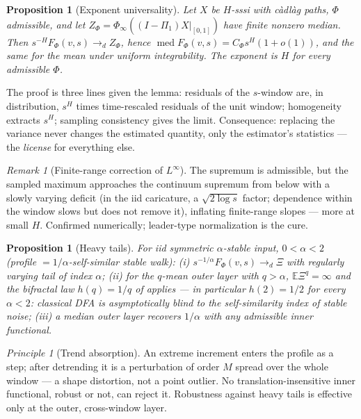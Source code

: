 \documentclass[10pt, letterpaper]{paper}
\newtheorem{proposition}[theorem]{Proposition}
\theoremstyle{remark}
\newtheorem{remark}[theorem]{Remark}
\newtheorem{principle}[theorem]{Principle}
\newcommand{\E}{\mathbb{E}}
\newcommand{\Phifun}{\Phi}
\begin{document}
\begin{proposition}[Exponent universality]\label{prop:universal}
Let $X$ be $H$-sssi with c\`adl\`ag paths, $\Phifun$ admissible,
and let $Z_\Phifun=\Phifun_\infty((I-\Pi_1)X|_{[0,1]})$ have finite
nonzero median. Then $s^{-H}F_\Phifun(v,s)\to_dZ_\Phifun$, hence
$\operatorname{med}F_\Phifun(v,s)=C_\Phifun s^H(1+o(1))$, and the
same for the mean under uniform integrability. The exponent is $H$
for \emph{every} admissible $\Phifun$.
\end{proposition}

The proof is three lines given the lemma: residuals of the
$s$-window are, in distribution, $s^H$ times time-rescaled residuals
of the unit window; homogeneity extracts $s^H$; sampling consistency
gives the limit. Consequence: replacing the variance never changes
the estimated quantity, only the estimator's statistics --- the
\emph{license} for everything else.

\begin{remark}[Finite-range correction of $L^\infty$]\label{rem:linf}
The supremum is admissible, but the sampled maximum approaches the
continuum supremum from below with a slowly varying deficit (in the
iid caricature, a $\sqrt{2\log s}$ factor; dependence within the
window slows but does not remove it), inflating finite-range slopes
--- more at small $H$. Confirmed numerically; leader-type
normalization \citep{jaffard2004} is the cure.
\end{remark}

\begin{proposition}[Heavy tails]\label{prop:stable}
For iid symmetric $\alpha$-stable input, $0<\alpha<2$ (profile
$=1/\alpha$-self-similar stable walk): (i)
$s^{-1/\alpha}F_\Phifun(v,s)\to_d\Xi$ with regularly varying tail of
index $\alpha$; (ii) for the $q$-mean outer layer with $q>\alpha$,
$\E\Xi^q=\infty$ and the bifractal law $h(q)=1/q$ of
\citet{nakao2000} applies --- in particular $h(2)=1/2$ for every
$\alpha<2$: \emph{classical DFA is asymptotically blind to the
self-similarity index of stable noise}; (iii) a median outer layer
recovers $1/\alpha$ with any admissible inner functional.
\end{proposition}

\begin{principle}[Trend absorption]\label{pri:trend}
An extreme increment enters the profile as a step; after detrending
it is a perturbation of order $M$ spread over the whole window --- a
shape distortion, not a point outlier. No translation-insensitive
inner functional, robust or not, can reject it. Robustness against
heavy tails is effective only at the outer, cross-window layer.
\end{principle}
\end{document}
